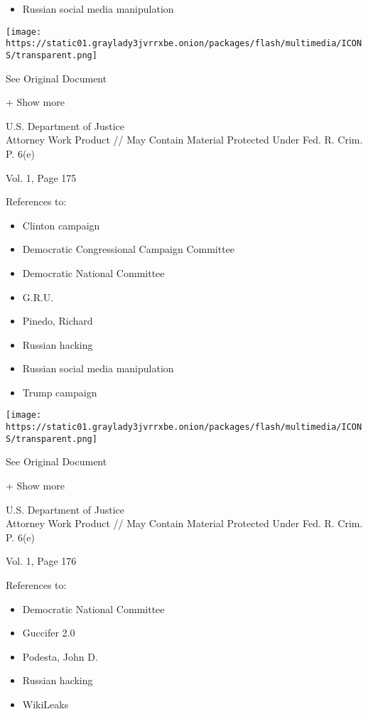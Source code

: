 \begin{itemize}
\tightlist
\item
  Russian social media manipulation
\end{itemize}

\protect\hyperlink{}{}

\texttt{[image: https://static01.graylady3jvrrxbe.onion/packages/flash/multimedia/ICONS/transparent.png]}

See Original Document

+ Show more

U.S. Department of Justice\\
Attorney Work Product // May Contain Material Protected Under Fed. R.
Crim. P. 6(e)

Vol. 1, Page 175

References to:

\begin{itemize}
\tightlist
\item
  Clinton campaign
\item
  Democratic Congressional Campaign Committee
\item
  Democratic National Committee
\item
  G.R.U.
\item
  Pinedo, Richard
\item
  Russian hacking
\item
  Russian social media manipulation
\item
  Trump campaign
\end{itemize}

\protect\hyperlink{}{}

\texttt{[image: https://static01.graylady3jvrrxbe.onion/packages/flash/multimedia/ICONS/transparent.png]}

See Original Document

+ Show more

U.S. Department of Justice\\
Attorney Work Product // May Contain Material Protected Under Fed. R.
Crim. P. 6(e)

Vol. 1, Page 176

References to:

\begin{itemize}
\tightlist
\item
  Democratic National Committee
\item
  Guccifer 2.0
\item
  Podesta, John D.
\item
  Russian hacking
\item
  WikiLeaks
\end{itemize}

